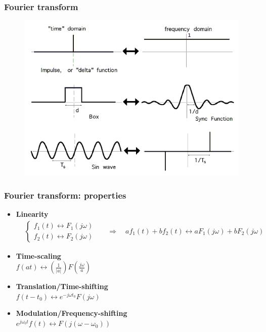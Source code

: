 \begin{frame}
	\frametitle{Fourier transform}
	\begin{figure}
		\includegraphics[width=.8\linewidth]{fourier_examples}
	\end{figure}
\end{frame}

\begin{frame}
	\frametitle{Fourier transform: properties}
	\begin{itemize}
		\item \textbf{Linearity} \\
		\vspace{-3ex}
		\begin{align*}
		& \begin{cases}
		f_1(t) \leftrightarrow F_1(j\omega)\\
		f_2(t) \leftrightarrow F_2(j\omega)
		\end{cases} && \Rightarrow \quad a f_1(t) + b f_2(t) \leftrightarrow a F_1(j\omega) + b F_2(j \omega)
		\end{align*}
		\item \textbf{Time-scaling} \\
		\medskip
		$f(a t) \leftrightarrow (\frac{1}{|a|}) F(\frac{j \omega}{a})$
		\medskip
		\item \textbf{Translation/Time-shifting} \\
		\medskip
		$f (t - t_0) \leftrightarrow e^{-j \omega t_0} F(j\omega)$
		\medskip
		\item \textbf{Modulation/Frequency-shifting} \\
		\medskip
		$e^{j \omega_0 t} f(t) \leftrightarrow F(j (\omega - \omega_0))$
	\end{itemize}
\end{frame}

